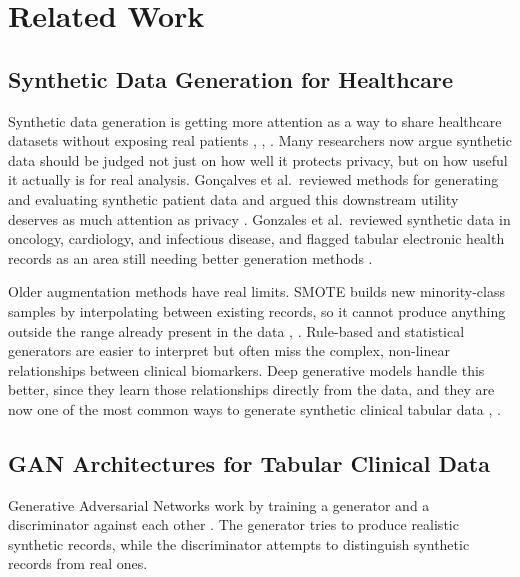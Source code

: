 \documentclass[journal]{IEEEtran}
\begin{document}
\FloatBarrier
\section{Related Work}
\label{sec:related}

\subsection{Synthetic Data Generation for Healthcare}

Synthetic data generation is getting more attention as a way to share healthcare datasets without exposing real patients \cite{goncalves2020}, \cite{gonzales2023}, \cite{guillaudeux2023}. Many researchers now argue synthetic data should be judged not just on how well it protects privacy, but on how useful it actually is for real analysis. Gon\c{c}alves et al.\ reviewed methods for generating and evaluating synthetic patient data and argued this downstream utility deserves as much attention as privacy \cite{goncalves2020}. Gonzales et al.\ reviewed synthetic data in oncology, cardiology, and infectious disease, and flagged tabular electronic health records as an area still needing better generation methods \cite{gonzales2023}.

Older augmentation methods have real limits. SMOTE builds new minority-class samples by interpolating between existing records, so it cannot produce anything outside the range already present in the data \cite{kumari2024}, \cite{figueira2022}. Rule-based and statistical generators are easier to interpret but often miss the complex, non-linear relationships between clinical biomarkers. Deep generative models handle this better, since they learn those relationships directly from the data, and they are now one of the most common ways to generate synthetic clinical tabular data \cite{yan2022}, \cite{nikolentzos2023}.

\subsection{GAN Architectures for Tabular Clinical Data}

Generative Adversarial Networks work by training a generator and a discriminator against each other \cite{vega2020}. The generator tries to produce realistic synthetic records, while the discriminator attempts to distinguish synthetic records from real ones.
\end{document}
